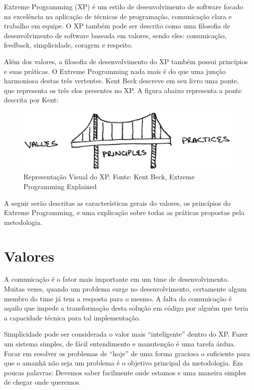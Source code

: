 Extreme Programming (XP) é um estilo de desenvolvimento de software focado na excelência na aplicação de técnicas de programação, comunicação clara e trabalho em equipe. O XP também pode ser descrito como uma filosofia de desenvolvimento de software baseada em valores, sendo eles: comunicação, feedback, simplicidade, coragem e respeito.

Além dos valores, a filosofia de desenvolvimento do XP também possui princípios e suas práticas. O Extreme Programming nada mais é do que uma junção harmoniosa destas três vertentes. Kent Beck descreve em seu livro uma ponte, que representa os três elos presentes no XP. A figura abaixo representa a ponte descrita por Kent:

\begin{figure}[h]
	\centering
	\label{fig01}
		\includegraphics[keepaspectratio=true,scale=0.6]{figuras/fig01.eps}
	\caption{Representação Visual do XP. Fonte: Kent Beck, Extreme Programming Explained}
\end{figure}

A seguir serão descritas as características gerais do valores, os princípios do Extreme Programming, e uma explicação sobre todas as práticas propostas pela metodologia.

\section{Valores}

A comunicação é o fator mais importante em um time de desenvolvimento. Muitas vezes, quando um problema surge no desenvolvimento, certamente algum membro do time já tem a resposta para o mesmo. A falta da comunicação é aquilo que impede a transformação desta solução em código por alguém que teria a capacidade técnica para tal implementação.

Simplicidade pode ser considerada o valor mais “inteligente” dentro do XP. Fazer um sistema simples, de fácil entendimento e manutenção é uma tarefa árdua. Focar em resolver os problemas de “hoje” de uma forma graciosa o suficiente para que o amanhã não seja um problema é o objetivo principal da metodologia. Em poucas palavras: Devemos saber facilmente onde estamos e uma maneira simples de chegar onde queremos.


